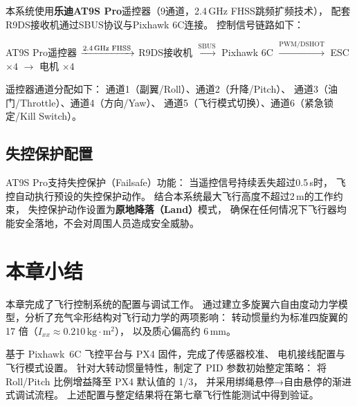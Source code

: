 本系统使用\textbf{乐迪AT9S Pro}遥控器（9通道，2.4\,GHz FHSS跳频扩频技术），
配套R9DS接收机通过SBUS协议与Pixhawk 6C连接。
控制信号链路如下：

\begin{center}
AT9S Pro遥控器
$\xrightarrow{\text{2.4\,GHz FHSS}}$
R9DS接收机
$\xrightarrow{\text{SBUS}}$
Pixhawk 6C
$\xrightarrow{\text{PWM/DSHOT}}$
ESC $\times 4$
$\rightarrow$
电机 $\times 4$
\end{center}

遥控器通道分配如下：
通道1（副翼/Roll）、通道2（升降/Pitch）、
通道3（油门/Throttle）、通道4（方向/Yaw）、
通道5（飞行模式切换）、通道6（紧急锁定/Kill Switch）。

\subsection{失控保护配置}

AT9S Pro支持失控保护（Failsafe）功能：
当遥控信号持续丢失超过0.5\,s时，
飞控自动执行预设的失控保护动作。
结合本系统最大飞行高度不超过2\,m的工作约束，
失控保护动作设置为\textbf{原地降落（Land）}模式，
确保在任何情况下飞行器均能安全落地，不会对周围人员造成安全威胁。


\section{本章小结}

本章完成了飞行控制系统的配置与调试工作。
通过建立多旋翼六自由度动力学模型，分析了充气伞形结构对飞行动力学的两项影响：
转动惯量约为标准四旋翼的 17 倍（$I_{xx} \approx 0.210\,\text{kg}\cdot\text{m}^2$），
以及质心偏高约 6\,mm。

基于 Pixhawk~6C 飞控平台与 PX4 固件，完成了传感器校准、
电机接线配置与飞行模式设置。
针对大转动惯量特性，制定了 PID 参数初始整定策略：
将 Roll/Pitch 比例增益降至 PX4 默认值的 1/3，
并采用绑绳悬停→自由悬停的渐进式调试流程。
上述配置与整定结果将在第七章飞行性能测试中得到验证。
